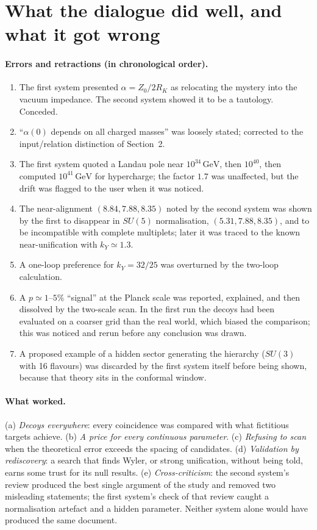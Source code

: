 \documentclass[11pt,a4paper]{article}
\newcommand{\kY}{k_Y}
\newcommand{\GeV}{\,\mathrm{GeV}}
\begin{document}
\section{What the dialogue did well, and what it got wrong}

\paragraph{Errors and retractions (in chronological order).}
\begin{enumerate}\itemsep1pt
\item The first system presented $\alpha=Z_0/2R_K$ as relocating the mystery into the vacuum impedance. The second system showed it
to be a tautology. Conceded.
\item ``$\alpha(0)$ depends on all charged masses'' was loosely stated; corrected to the input/relation distinction of Section~2.
\item The first system quoted a Landau pole near $10^{34}\GeV$, then $10^{40}$, then computed $10^{41}\GeV$ for hypercharge; the
factor $1.7$ was unaffected, but the drift was flagged to the user when it was noticed.
\item The near-alignment $(8.84,7.88,8.35)$ noted by the second system was shown by the first to disappear in $SU(5)$
normalisation, $(5.31,7.88,8.35)$, and to be incompatible with complete multiplets; later it was traced to the known
near-unification with $\kY\simeq1.3$.
\item A one-loop preference for $\kY=32/25$ was overturned by the two-loop calculation.
\item A $p\simeq1$--$5\%$ ``signal'' at the Planck scale was reported, explained, and then dissolved by the two-scale scan. In
the first run the decoys had been evaluated on a coarser grid than the real world, which biased the comparison; this was
noticed and rerun before any conclusion was drawn.
\item A proposed example of a hidden sector generating the hierarchy ($SU(3)$ with 16 flavours) was discarded by the first system
itself before being shown, because that theory sits in the conformal window.
\end{enumerate}

\paragraph{What worked.} (a) \emph{Decoys everywhere}: every coincidence was compared with what fictitious targets achieve.
(b) \emph{A price for every continuous parameter}. (c) \emph{Refusing to scan} when the theoretical error exceeds the spacing of
candidates. (d) \emph{Validation by rediscovery}: a search that finds Wyler, or strong unification, without being told, earns some
trust for its null results. (e) \emph{Cross-criticism}: the second system's review produced the best single argument of the
study and removed two misleading statements; the first system's check of that review caught a normalisation artefact and a
hidden parameter. Neither system alone would have produced the same document.
\end{document}
